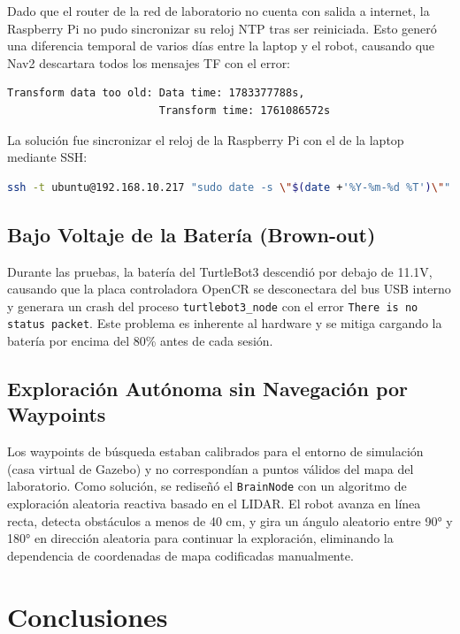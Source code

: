 \documentclass[12pt,a4paper]{article}
\begin{document}
Dado que el router de la red de laboratorio no cuenta con salida a internet, la Raspberry Pi no pudo sincronizar su reloj NTP tras ser reiniciada. Esto gener\'o una diferencia temporal de varios d\'ias entre la laptop y el robot, causando que Nav2 descartara todos los mensajes TF con el error:

\begin{verbatim}
Transform data too old: Data time: 1783377788s,
                        Transform time: 1761086572s
\end{verbatim}

La soluci\'on fue sincronizar el reloj de la Raspberry Pi con el de la laptop mediante SSH:

\begin{lstlisting}[language=bash, caption={Sincronizaci\'on del reloj v\'ia SSH}]
ssh -t ubuntu@192.168.10.217 "sudo date -s \"$(date +'%Y-%m-%d %T')\""
\end{lstlisting}

\subsection{Bajo Voltaje de la Bater\'ia (Brown-out)}

Durante las pruebas, la bater\'ia del TurtleBot3 descendi\'o por debajo de 11.1V, causando que la placa controladora OpenCR se desconectara del bus USB interno y generara un crash del proceso \texttt{turtlebot3\_node} con el error \texttt{There is no status packet}. Este problema es inherente al hardware y se mitiga cargando la bater\'ia por encima del 80\% antes de cada sesi\'on.

\subsection{Exploraci\'on Aut\'onoma sin Navegaci\'on por Waypoints}

Los waypoints de b\'usqueda estaban calibrados para el entorno de simulaci\'on (casa virtual de Gazebo) y no correspond\'ian a puntos v\'alidos del mapa del laboratorio. Como soluci\'on, se redise\~n\'o el \texttt{BrainNode} con un algoritmo de exploraci\'on aleatoria reactiva basado en el LIDAR. El robot avanza en l\'inea recta, detecta obst\'aculos a menos de 40 cm, y gira un \'angulo aleatorio entre 90° y 180° en direcci\'on aleatoria para continuar la exploraci\'on, eliminando la dependencia de coordenadas de mapa codificadas manualmente.

\section{Conclusiones}
\end{document}
